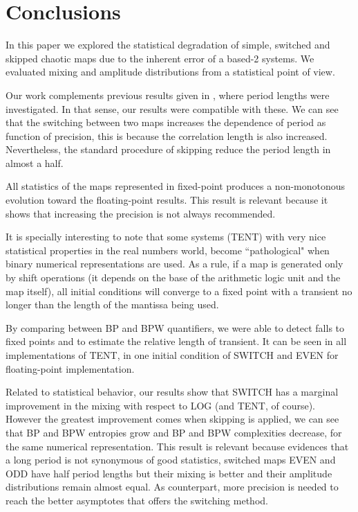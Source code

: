 \section{Conclusions}\label{sec:conclusions}
In this paper we explored the statistical degradation of simple, switched and skipped chaotic maps due to the inherent error of a based-2 systems.
We evaluated mixing and amplitude distributions from a statistical point of view.

Our work complements previous results given in \cite{Nagaraj2008}, where period lengths were investigated.
In that sense, our results were compatible with these.
We can see that the switching between two maps increases the dependence of period as function of precision, this is because the correlation length is also increased.
Nevertheless, the standard procedure of skipping reduce the period length in almost a half.

All statistics of the maps represented in fixed-point produces a non-monotonous evolution toward the floating-point results.
This result is relevant because it shows that increasing the precision is not always recommended.

It is specially interesting to note that some systems (TENT) with very nice statistical properties in the real numbers world, become ``pathological" when binary numerical representations are used.
As a rule, if a map is generated only by shift operations (it depends on the base of the arithmetic logic unit and the map itself), all initial conditions will converge to a fixed point with a transient no longer than the length of the mantissa being used.

By comparing between BP and BPW quantifiers, we were able to detect falls to fixed points and to estimate the relative length of transient.
It can be seen in all implementations of TENT, in one initial condition of SWITCH and EVEN for floating-point implementation.

Related to statistical behavior, our results show that SWITCH has a marginal improvement in the mixing with respect to LOG (and TENT, of course).
However the greatest improvement comes when skipping is applied, we can see that BP and BPW entropies grow and BP and BPW complexities decrease, for the same numerical representation.
This result is relevant because evidences that a long period is not synonymous of good statistics, switched maps EVEN and ODD have half period lengths but their mixing is better and their amplitude distributions remain almost equal.
As counterpart, more precision is needed to reach the better asymptotes that offers the switching method.
